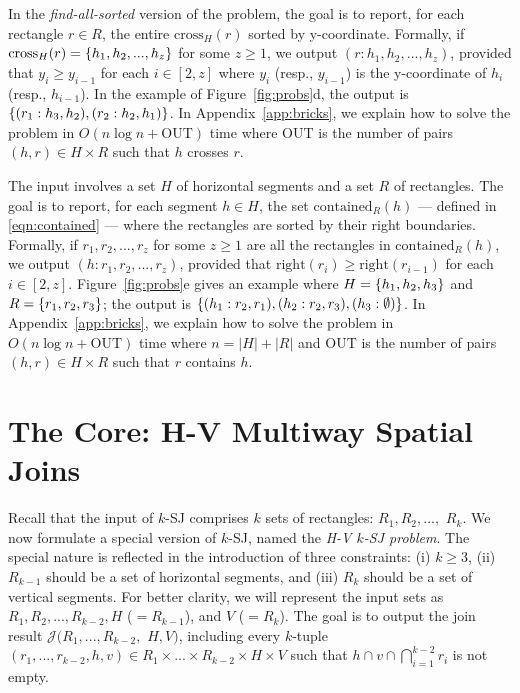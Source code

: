 \documentclass[acmsmall,review,anonymous]{acmart}
\def\vgap{\vspace{1mm}}
\def\extraspacing{\vspace{2mm} \noindent}
\def\J{\mathcal{J}}
\def\xright{\mathrm{right}}
\def\cross{\mathrm{cross}}
\def\contained{\mathrm{contained}}
\def\out{\mathrm{OUT}}
\begin{document}
\vgap

In the {\em find-all-sorted} version of the problem, the goal is to report, for each rectangle $r \in R$, the entire $\cross_H(r)$ sorted by y-coordinate. Formally, if $\cross_H(r) = \set{h_1, h_2, ..., h_z}$ for some $z \ge 1$, we output $(r: h_1, h_2, ..., h_z)$, provided that $y_i \ge y_{i-1}$ for each $i \in [2, z]$ where $y_i$ (resp., $y_{i-1}$) is the y-coordinate of $h_i$ (resp., $h_{i-1}$). In the example of Figure~\ref{fig:probs}d, the output is $\{(r_1: h_3, h_2), (r_2: h_2, h_1)\}$. In Appendix~\ref{app:bricks}, we explain how to solve the problem in $O(n \log n + \out)$ time where $\out$ is the number of pairs $(h, r) \in H \times R$ such that $h$ crosses $r$.


\extraspacing {\bf Problem $\bm{\mathscr{E}}$.} The input involves a set $H$ of horizontal segments and a set $R$ of rectangles. The goal is to report, for each segment $h \in H$, the set $\contained_R(h)$ --- defined in \eqref{eqn:contained} --- where the rectangles are sorted by their right boundaries. Formally, if $r_1, r_2, ..., r_z$ for some $z \ge 1$ are all the rectangles in $\contained_R(h)$, we output $(h: r_1, r_2, ..., r_z)$, provided that $\xright(r_i) \ge \xright(r_{i-1})$ for each $i \in [2, z]$. Figure~\ref{fig:probs}e gives an example where $H = \{h_1, h_2, h_3\}$ and $R = \{r_1, r_2, r_3\}$; the output is $\{(h_1: r_2, r_1), (h_2: r_2, r_3), (h_3: \emptyset)\}$. In Appendix~\ref{app:bricks}, we explain how to solve the problem in $O(n \log n + \out)$ time where $n = |H| + |R|$ and $\out$ is the number of pairs $(h, r) \in H \times R$ such that $r$ contains $h$.

\section{The Core: H-V Multiway Spatial Joins} \label{sec:hv}

Recall that the input of $k$-SJ comprises $k$ sets of rectangles: $R_1, R_2, ...,$ $R_k$. We now formulate a special version of $k$-SJ, named the {\em H-V $k$-SJ problem}. The special nature is reflected in the introduction of three constraints: (i) $k \ge 3$, (ii) $R_{k-1}$ should be a set of horizontal segments, and (iii) $R_k$ should be a set of vertical segments. For better clarity, we will represent the input sets as $R_1, R_2, ..., R_{k-2}, H$ ($=R_{k-1}$), and $V$ ($=R_k$). The goal is to output the join result $\J(R_1, ..., R_{k-2},$ $H, V)$, including every $k$-tuple $(r_1, ..., r_{k-2}, h, v) \in R_1 \times ... \times R_{k-2} \times H \times V$ such that $h \cap v \cap \bigcap_{i=1}^{k-2} r_i$ is not empty.
\end{document}
